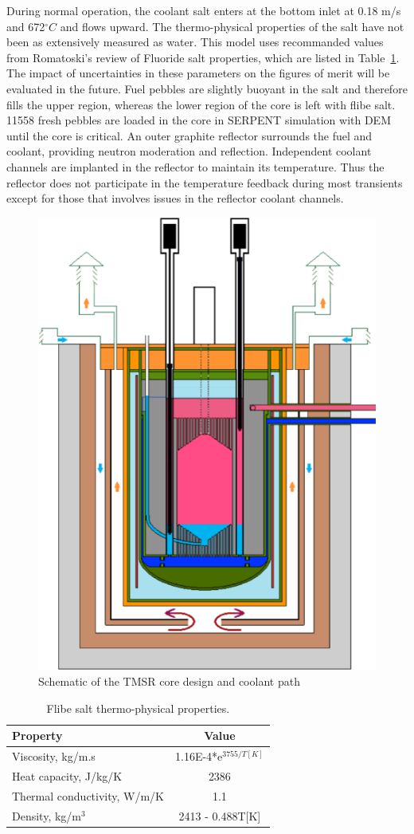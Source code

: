 \documentclass{elsarticle}
\begin{document}
During normal operation, the coolant salt enters at the bottom inlet at 0.18 m/s and 672$^{\circ}C$ and flows upward. The thermo-physical properties of the salt have not been as extensively measured as water. This model uses recommanded values from Romatoski's review of Fluoride salt properties\cite{Romatoski2017a}, which are listed in Table~\ref{tab:flibe}. The impact of uncertainties in these parameters on the figures of merit will be evaluated in the future.
Fuel pebbles are slightly buoyant in the salt and therefore fills the upper region, whereas the lower region of the core is left with flibe salt. 11558 fresh pebbles are loaded in the core in SERPENT simulation with DEM until the core is critical. An outer graphite reflector surrounds the fuel and coolant, providing neutron moderation and reflection. Independent coolant channels are implanted in the reflector to maintain its temperature. Thus the reflector does not participate in the temperature feedback during most transients except for those that involves issues in the reflector coolant channels.

\begin{figure}[h]
    \centering
    \includegraphics[width=0.6\columnwidth]{./images/design/TMSR_geom.png}
    \caption{Schematic of the TMSR core design and coolant path}
    \label{fig:TMSR}
\end{figure}


\begin{table}
  \caption{Flibe salt thermo-physical properties.}
  \begin{tabular}[h]{lc}
    \hline
    Property & Value\\
    \hline
    Viscosity, kg/m.s & 1.16E-4*e$^{3755/T[K]}$\\
    Heat capacity, J/kg/K & 2386\\
    Thermal conductivity, W/m/K & 1.1\\
    Density, kg/m$^3$ & 2413 - 0.488T[K]\\
    \hline
  \end{tabular}
\label{tab:flibe}
\end{table}
\end{document}
